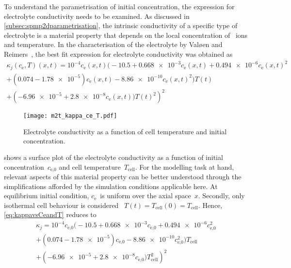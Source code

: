 To  understand  the parametrisation  of  initial  concentration, the  expression
for   electrolyte  conductivity   needs  to   be  examined.   As  discussed   in
\cref{subsec:spmp2dparametrisation},  the intrinsic  conductivity of  a specific
type  of  electrolyte  is  a  material   property  that  depends  on  the  local
concentration of ~ions and temperature.  In the characterisation of the
electrolyte by  Valøen and  Reimers~\cite{Valoen2005}, the best  fit expression
for electrolyte conductivity was obtained as
\begin{multline}\label{eq:kappavsCeandT}
    \kappa_j(c_\text{e},T)(x,t) =  10^{-4} c_\text{e}(x,t) \bigl(-10.5 + \num{0.668e-3} c_\text{e}(x,t) + \num{0.494e-6}  c_\text{e}{(x,t)}^2\\
    + (0.074 - \num{1.78e-5}) c_\text{e}(x,t) - \num{8.86e-10} c_\text{e}{(x,t)}^2 \bigr)T(t)\\
	+ \left(\num{-6.96e-5} + \num{2.8e-8} c_\text{e}{(x,t)})T(t)^2\right)^2
\end{multline}

\begin{figure}[!htbp]
    \centering
    \texttt{[image: m2t\_kappa\_ce\_T.pdf]}
    \caption[Surface plot of electrolyte conductivity]
    {Electrolyte conductivity as a function of cell temperature and initial concentration.
    }%
    \label{fig:kappavsCeandT}
\end{figure}

   shows    a   surface   plot   of    the   electrolyte
conductivity  as a  function  of initial  concentration~$c_\text{e,0}$ and  cell
temperature~$T_\text{cell}$. For the modelling task at hand, relevant aspects of
this  material property  can be  better understood  through the  simplifications
afforded by  the simulation conditions  applicable here. At  equilibrium initial
condition,  $c_\text{e}$~is uniform  over  the axial  space~$x$. Secondly,  only
isothermal  cell   behaviour  is   considered  \ie~${T(t)   =  T_\text{cell}(0)=
T_\text{cell}}$. Hence, \cref{eq:kappavsCeandT} reduces to
\begin{multline}\label{eq:kappavsCeinitandTcell}
    \kappa_j =  10^{-4} c_\text{e,0} \bigl(-10.5 + \num{0.668e-3} c_\text{e,0} + \num{0.494e-6}  c_\text{e,0}^2\\
        + (0.074 - \num{1.78e-5}) c_\text{e,0} - \num{8.86e-10}
    c_\text{e,0}^2 \bigr)T_\text{cell}\\
	+ \left(\num{-6.96e-5} + \num{2.8e-8} c_\text{e,0})T_\text{cell}^2\right)^2
\end{multline}

